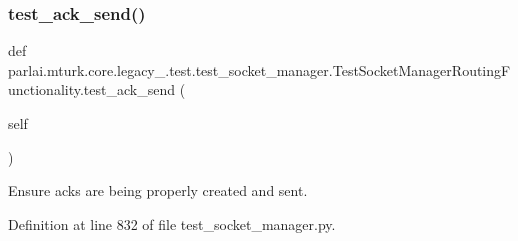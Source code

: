 \subsubsection{\texorpdfstring{test\+\_\+ack\+\_\+send()}{test\_ack\_send()}}
{\footnotesize\ttfamily def parlai.\+mturk.\+core.\+legacy\+\_.\+test.\+test\+\_\+socket\+\_\+manager.\+Test\+Socket\+Manager\+Routing\+Functionality.\+test\+\_\+ack\+\_\+send (\begin{DoxyParamCaption}\item[{}]{self }\end{DoxyParamCaption})}

\begin{DoxyVerb}Ensure acks are being properly created and sent.
\end{DoxyVerb}
 

Definition at line 832 of file test\+\_\+socket\+\_\+manager.\+py.


